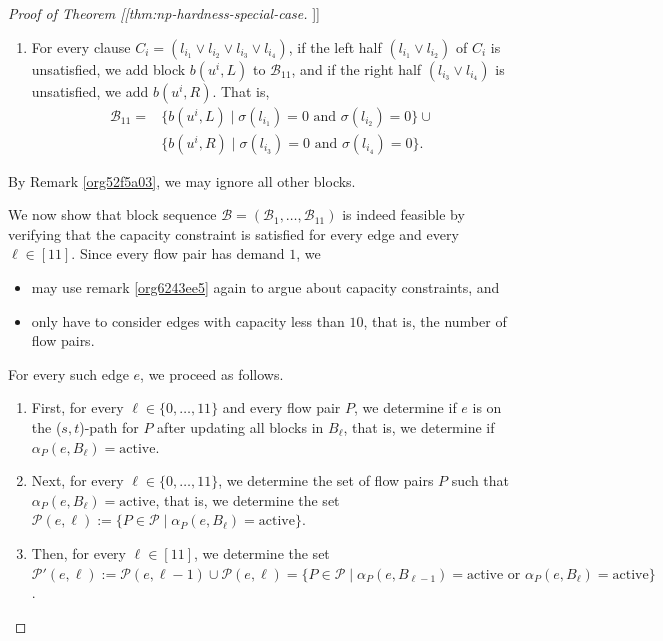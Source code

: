 \documentclass[fontsize=11pt,paper=a4]{book}
\begin{document}
\begin{proof}[Proof of Theorem [[thm:np-hardness-special-case]]]
\begin{enumerate}
\item For every clause \(C_i=(l_{i_1}\vee l_{i_2}\vee l_{i_3}\vee l_{i_4})\), if the left half \((l_{i_1}\vee l_{i_2})\) of \(C_i\) is unsatisfied, we add block \(b(u^i,L)\) to \(\mathscr{B}_{11}\), and if the right half \((l_{i_3}\vee l_{i_4})\) is unsatisfied, we add \(b(u^i,R)\).
That is,
\begin{align*}
\mathscr{B}_{11}=&\{b(u^i,L)\mid\sigma(l_{i_1})=0\text{ and }\sigma(l_{i_2})=0\}\cup\\
&\{b(u^i,R)\mid\sigma(l_{i_3})=0\text{ and }\sigma(l_{i_4})=0\}.
\end{align*}
\end{enumerate}

By Remark \ref{org52f5a03}, we may ignore all other blocks.

We now show that block sequence \(\mathcal{B}=(\mathscr{B}_1,\dots,\mathscr{B}_{11})\) is indeed feasible by verifying that the capacity constraint is satisfied for every edge and every \(\ell\in[11]\).
Since every flow pair has demand \(1\), we

\begin{itemize}
\item may use remark \ref{org6243ee5} again to argue about capacity constraints, and

\item only have to consider edges with capacity less than \(10\), that is, the number of flow pairs.
\end{itemize}


For every such edge \(e\), we proceed as follows.

\begin{enumerate}
\item First, for every \(\ell\in\{0,\dots,11\}\) and every flow pair \(P\), we determine if \(e\) is on the (\(s,t\))-path for \(P\) after updating all blocks in \(B_{\ell}\), that is, we determine if \(\alpha_P(e,B_{\ell})=\mathrm{active}\).

\item Next, for every \(\ell\in\{0,\dots,11\}\), we determine the set of flow pairs \(P\) such that \(\alpha_P(e,B_{\ell})=\mathrm{active}\), that is, we determine the set \(\mathcal{P}(e,\ell):=\{P\in\mathcal{P}\mid\alpha_P(e,B_{\ell})=\mathrm{active}\}\).

\item Then, for every \(\ell\in[11]\), we determine the set \(\mathcal{P}'(e,\ell):=\mathcal{P}(e,\ell-1)\cup\mathcal{P}(e,\ell)=\{P\in\mathcal{P}\mid\alpha_P(e,B_{\ell-1})=\mathrm{active}\text{ or }\alpha_P(e,B_{\ell})=\mathrm{active}\}\).


\end{enumerate}
\end{proof}
\end{document}
